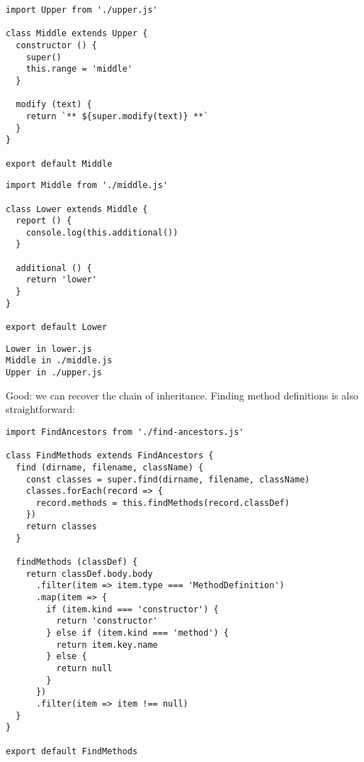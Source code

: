 \documentclass[krantzl]{krantz}
\begin{document}
\begin{lstlisting}[frame=single,frameround=tttt]
import Upper from './upper.js'

class Middle extends Upper {
  constructor () {
    super()
    this.range = 'middle'
  }

  modify (text) {
    return `** ${super.modify(text)} **`
  }
}

export default Middle
\end{lstlisting}



\begin{lstlisting}[frame=single,frameround=tttt]
import Middle from './middle.js'

class Lower extends Middle {
  report () {
    console.log(this.additional())
  }

  additional () {
    return 'lower'
  }
}

export default Lower
\end{lstlisting}



\begin{lstlisting}[frame=single,frameround=tttt]
Lower in lower.js
Middle in ./middle.js
Upper in ./upper.js
\end{lstlisting}



Good: we can recover the chain of inheritance.
Finding method definitions is also straightforward:


\begin{lstlisting}[frame=single,frameround=tttt]
import FindAncestors from './find-ancestors.js'

class FindMethods extends FindAncestors {
  find (dirname, filename, className) {
    const classes = super.find(dirname, filename, className)
    classes.forEach(record => {
      record.methods = this.findMethods(record.classDef)
    })
    return classes
  }

  findMethods (classDef) {
    return classDef.body.body
      .filter(item => item.type === 'MethodDefinition')
      .map(item => {
        if (item.kind === 'constructor') {
          return 'constructor'
        } else if (item.kind === 'method') {
          return item.key.name
        } else {
          return null
        }
      })
      .filter(item => item !== null)
  }
}

export default FindMethods
\end{lstlisting}
\end{document}
